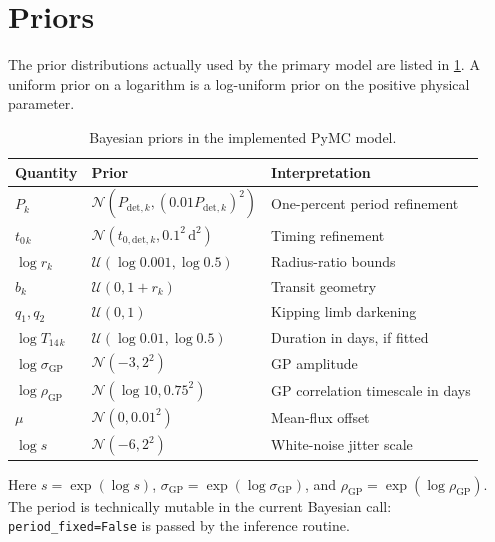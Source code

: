 \documentclass[12pt,a4paper,oneside]{report}
\newcommand{\Porb}{\ensuremath{P}}
\newcommand{\Tfourteen}{\ensuremath{T_{14}}}
\newcommand{\tzero}{\ensuremath{t_{0}}}
\newcommand{\code}[1]{\texttt{\small #1}}
\begin{document}
\section{Priors}
The prior distributions actually used by the primary model are listed in
\cref{tab:priors}. A uniform prior on a logarithm is a log-uniform prior on the
positive physical parameter.
\begin{longtable}{p{}p{}p{}}
\caption{Bayesian priors in the implemented PyMC model.}\label{tab:priors}\\
\toprule
Quantity & Prior & Interpretation\\
\midrule
\(\Porb{}_{k}\) & \(\mathcal{N}(P_{\mathrm{det},k},(0.01P_{\mathrm{det},k})^2)\) & One-percent period refinement\\
\(\tzero{}_{k}\) & \(\mathcal{N}(t_{0,\mathrm{det},k},0.1^2\,\mathrm{d}^2)\) & Timing refinement\\
\(\log r_k\) & \(\mathcal{U}(\log0.001,\log0.5)\) & Radius-ratio bounds\\
\(b_k\) & \(\mathcal{U}(0,1+r_k)\) & Transit geometry\\
\(q_1,q_2\) & \(\mathcal{U}(0,1)\) & Kipping limb darkening\\
\(\log\Tfourteen{}_{k}\) & \(\mathcal{U}(\log0.01,\log0.5)\) & Duration in days, if fitted\\
\(\log\sigma_{\mathrm{GP}}\) & \(\mathcal{N}(-3,2^2)\) & GP amplitude\\
\(\log\rho_{\mathrm{GP}}\) & \(\mathcal{N}(\log10,0.75^2)\) & GP correlation timescale in days\\
\(\mu\) & \(\mathcal{N}(0,0.01^2)\) & Mean-flux offset\\
\(\log s\) & \(\mathcal{N}(-6,2^2)\) & White-noise jitter scale\\
\bottomrule
\end{longtable}
Here \(s=\exp(\log s)\), \(\sigma_{\mathrm{GP}}=\exp(\log\sigma_{\mathrm{GP}})\),
and \(\rho_{\mathrm{GP}}=\exp(\log\rho_{\mathrm{GP}})\). The period is
technically mutable in the current Bayesian call: \code{period\_fixed=False}
is passed by the inference routine.
\end{document}
